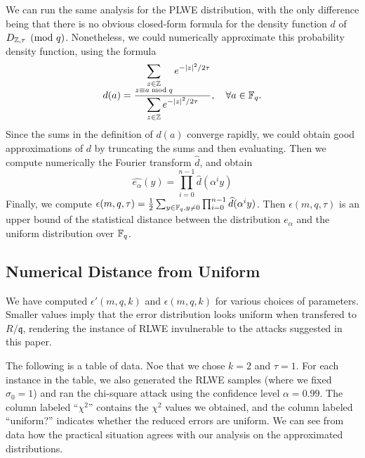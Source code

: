 \documentclass[envcountsect]{llncs}
\begin{document}
We can run the same analysis for the PLWE distribution, with the only difference being that there is no obvious closed-form formula for the density function $d$  of $D_{\mathbb{Z},\tau} \pmod{q}$. Nonetheless, we could numerically approximate this probability density function, using the formula
\[
        d(a)  = \frac{\displaystyle{\sum_{\substack{z \in \mathbb{Z}\\ z \equiv a\bmod{q}}} e^{-|z|^2/2\tau}}}{\displaystyle{\sum_{z \in \mathbb{Z}} e^{-|z|^2/2\tau}}}, \quad \forall a \in \mathbb{F}_q.
\]
Since the sums in the definition of $d(a)$ converge rapidly, we could obtain good approximations of $d$ by truncating the sums and then evaluating. Then we compute numerically the Fourier transform $\hat{d}$, and obtain
\[
    \widehat{e_\alpha}(y) = \prod_{i=0}^{n-1} \hat{d}(\alpha^i y)
\]
Finally, we compute $\epsilon(m,q,\tau) = \frac{1}{2} \sum_{y \in \mathbb{F}_q, y \neq 0} \prod_{i=0}^{n-1} \widehat{d}(\alpha^i y)$. Then $\epsilon(m,q,\tau)$ is an upper bound of the statistical distance  between the distribution $e_\alpha$ and the uniform distribution over $\mathbb{F}_q$. 

\subsection{Numerical Distance from Uniform}

We have computed $\epsilon'(m,q,k)$ and $\epsilon(m,q,k)$ for various choices of parameters.  Smaller values imply that the error distribution looks uniform when transfered to $R/\mathfrak{q}$, rendering the instance of RLWE invulnerable to the attacks suggested in this paper.  

The following is a table of data. Noe that we chose $k = 2$ and $\tau = 1$. For each instance in the table, we also  generated the RLWE samples (where we fixed $\sigma_0 = 1$) and ran the chi-square attack using the confidence level $\alpha = 0.99$. The column labeled ``$\chi^2$'' contains the $\chi^2$ values we obtained, and the column labeled ``uniform?'' indicates whether the reduced errors are uniform. We can see from data how the practical situation agrees with our analysis on the approximated distributions. 
\end{document}

